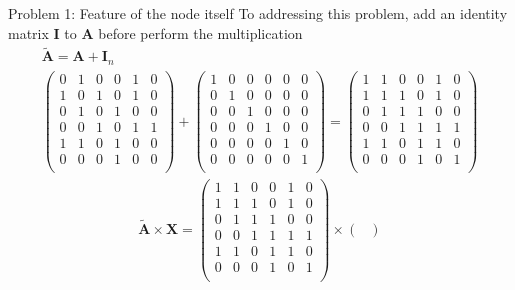 \documentclass[notheorems, aspectratio=54]{beamer}
\begin{document}
	\begin{frame}{Problem 1: Feature of the node itself}
	 	To addressing this problem, add an identity matrix $\mathbf{I}$ to  $\mathbf{A}$ before perform the multiplication
		\begin{gather*}
			\widetilde{\mathbf{A}} = \mathbf{A} + \mathbf{I}_n \\
			\begin{pmatrix}
				0 & 1 & 0 & 0 & 1 & 0\\
				1 & 0 & 1 & 0 & 1 & 0\\
				0 & 1 & 0 & 1 & 0 & 0\\
				0 & 0 & 1 & 0 & 1 & 1\\
				1 & 1 & 0 & 1 & 0 & 0\\
				0 & 0 & 0 & 1 & 0 & 0\\
			\end{pmatrix} + \begin{pmatrix}
			1 & 0 & 0 & 0 & 0 & 0\\
			0 & 1 & 0 & 0 & 0 & 0\\
			0 & 0 & 1 & 0 & 0 & 0\\
			0 & 0 & 0 & 1 & 0 & 0\\
			0 & 0 & 0 & 0 & 1 & 0\\
			0 & 0 & 0 & 0 & 0 & 1\\ 
		\end{pmatrix} = \begin{pmatrix}
		1 & 1 & 0 & 0 & 1 & 0\\
		1 & 1 & 1 & 0 & 1 & 0\\
		0 & 1 & 1 & 1 & 0 & 0\\
		0 & 0 & 1 & 1 & 1 & 1\\
		1 & 1 & 0 & 1 & 1 & 0\\
		0 & 0 & 0 & 1 & 0 & 1\\
	\end{pmatrix}
		\end{gather*}
	\begin{gather*}
		\widetilde{\mathbf{A}} \times \mathbf{X} = 
		\begin{pmatrix}
			1 & 1 & 0 & 0 & 1 & 0\\
			1 & 1 & 1 & 0 & 1 & 0\\
			0 & 1 & 1 & 1 & 0 & 0\\
			0 & 0 & 1 & 1 & 1 & 1\\
			1 & 1 & 0 & 1 & 1 & 0\\
			0 & 0 & 0 & 1 & 0 & 1\\
		\end{pmatrix} \times \begin{pmatrix}

\end{pmatrix}
\end{gather*}
\end{frame}
\end{document}
